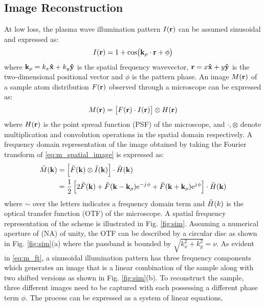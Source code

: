 \documentclass[11pt]{article}
\begin{document}
\subsection{Image Reconstruction}
%
At low loss, the plasma wave illumination pattern $I(\mathbf{r})$ can be assumed sinusoidal and expressed as:
%
\begin{equation}
  I(\mathbf{r}) = 1 + \cos(\mathbf{k}_{\rho} \cdot \mathbf{r} + \phi)
  \label{eq:intensity}
\end{equation}
where $\mathbf{k}_{\rho} = k_x \mathbf{\hat{x}} + k_y \mathbf{\hat{y}}$ is the spatial frequency wavevector,  $\mathbf{r} = x \mathbf{\hat{x}} +  y \mathbf{\hat{y}}$ is the two-dimensional positional vector and $\phi$ is the pattern phase. An image $M(\mathbf{r})$ of a sample atom distribution $F(\mathbf{r})$ observed through a microscope can be expressed as:
%
\begin{equation}
  M(\mathbf{r}) = \left[ F(\mathbf{r}) \cdot I(\mathbf{r}) \right] \otimes H(\mathbf{r})
  \label{eq:m_spatial_image}
\end{equation}
%
where $H(\mathbf{r})$ is the point spread function (PSF) of the microscope, and $\cdot, \otimes$ denote multiplication and convolution operations in the spatial domain respectively. A frequency domain representation of the image obtained by taking the Fourier transform of \eqref{eq:m_spatial_image} is expressed as:
%
\begin{equation}
  \begin{split}
    \tilde{M}(\mathbf{k}) &= \left[ \tilde{F}(\mathbf{k}) \otimes \tilde{I}(\mathbf{k}) \right] \cdot \tilde{H}(\mathbf{k}) \\
     &= \frac{1}{2} \left[ 2\tilde{F}(\mathbf{k}) + \tilde{F}(\mathbf{k} - \mathbf{k}_{\rho}) \mathrm{e}^{- j\mkern1mu \phi} + \tilde{F}(\mathbf{k} + \mathbf{k}_{\rho}) \mathrm{e}^{j\mkern1mu \phi} \right] \cdot \tilde{H}(\mathbf{k})
  \end{split}
  \label{eq:m_ft}
\end{equation}
%
where $\sim$ over the letters indicates a frequency domain term and $\tilde{H}(k)$ is the optical transfer function (OTF) of the microscope. A spatial frequency representation of the scheme is illustrated in Fig. \ref{fig:sim}. Assuming a numerical aperture of (NA) of unity, the OTF can be described by a circular disc as shown in Fig. \ref{fig:sim}(a) where the passband is bounded by $\sqrt{k_x^2 + k_y^2} = \nu$. As evident in \eqref{eq:m_ft}, a sinusoidal illumination pattern has three frequency components which generates an image that is a linear combination of the sample along with two shifted versions as shown in Fig. \ref{fig:sim}(b). To reconstruct the sample, three different images need to be captured with each possessing a different phase term $\phi$. The process can be expressed as a system of linear equations,
\end{document}
